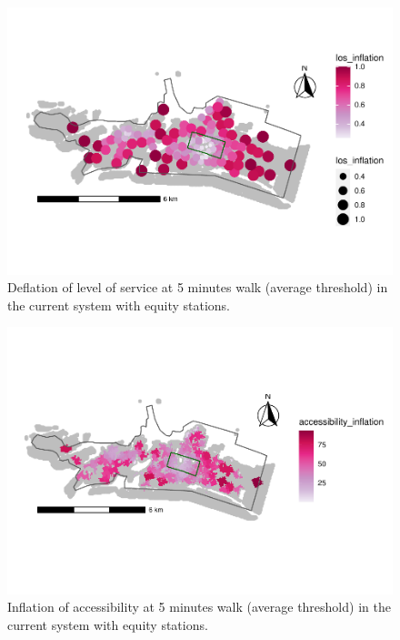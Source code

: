 \documentclass[]{elsarticle} %
\begin{document}
\begin{figure}

{\centering \includegraphics[width=0.9\linewidth]{Bike-share-spatial-equity-R1_files/figure-latex/figure-10-1} 

}

\caption{Deflation of level of service at 5 minutes walk (average threshold) in the current system with equity stations.}\label{fig:figure-10}
\end{figure}

\begin{figure}

{\centering \includegraphics[width=0.9\linewidth]{Bike-share-spatial-equity-R1_files/figure-latex/figure-11-1} 

}

\caption{Inflation of accessibility at 5 minutes walk (average threshold) in the current system with equity stations.}\label{fig:figure-11}
\end{figure}
\end{document}
